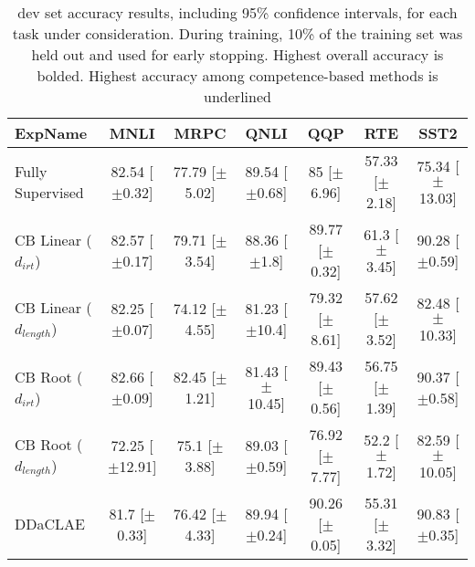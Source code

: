 \begin{table*}[ht]
\centering
\begingroup\small
\begin{tabular}{lcccccc}
  \toprule
ExpName & MNLI & MRPC & QNLI & QQP & RTE & SST2 \\ 
  \midrule
Fully Supervised & 82.54 [$\pm$0.32] & 77.79 [$\pm$5.02] & 89.54 [$\pm$0.68] & 85 [$\pm$6.96] & 57.33 [$\pm$2.18] & 75.34 [$\pm$13.03] \\ 
  CB Linear ($d_{irt}$) & 82.57 [$\pm$0.17] & 79.71 [$\pm$3.54] & 88.36 [$\pm$1.8] & 89.77 [$\pm$0.32] & 61.3 [$\pm$3.45] & 90.28 [$\pm$0.59] \\ 
  CB Linear ($d_{length}$) & 82.25 [$\pm$0.07] & 74.12 [$\pm$4.55] & 81.23 [$\pm$10.4] & 79.32 [$\pm$8.61] & 57.62 [$\pm$3.52] & 82.48 [$\pm$10.33] \\ 
  CB Root ($d_{irt}$) & 82.66 [$\pm$0.09] & 82.45 [$\pm$1.21] & 81.43 [$\pm$10.45] & 89.43 [$\pm$0.56] & 56.75 [$\pm$1.39] & 90.37 [$\pm$0.58] \\ 
  CB Root ($d_{length}$) & 72.25 [$\pm$12.91] & 75.1 [$\pm$3.88] & 89.03 [$\pm$0.59] & 76.92 [$\pm$7.77] & 52.2 [$\pm$1.72] & 82.59 [$\pm$10.05] \\ 
  DDaCLAE & 81.7 [$\pm$0.33] & 76.42 [$\pm$4.33] & 89.94 [$\pm$0.24] & 90.26 [$\pm$0.05] & 55.31 [$\pm$3.32] & 90.83 [$\pm$0.35] \\ 
   \bottomrule
\end{tabular}
\endgroup
\caption{dev set accuracy results, including 95\% confidence intervals, for each task under consideration. During training, 10\% of the training set was held out and used for early stopping. Highest overall accuracy is bolded. Highest accuracy among competence-based methods is underlined} 
\label{tab:acc_bert-False}
\end{table*}
